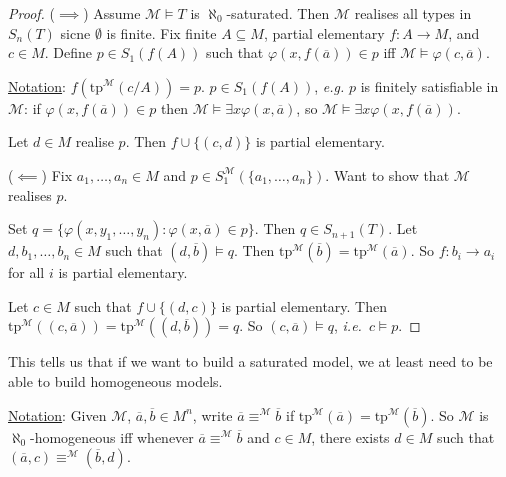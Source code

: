 \documentclass[]{article}
\theoremstyle{custhm}
\theoremstyle{cusdef}
\theoremstyle{custhm}
\theoremstyle{custhm}
\theoremstyle{custhm}
\theoremstyle{ex}
\theoremstyle{custhm}
\theoremstyle{cusdef}
\theoremstyle{remark}
\theoremstyle{remark}
\newcommand{\ra}{\rightarrow}
\newcommand{\ie}{\textit{i.e.}}
\renewcommand{\it}[1]{\textit{#1}}
\newcommand{\M}{\mathcal{M}}
\renewcommand{\phi}{\varphi}
\renewcommand{\bar}{\overline}
\newcommand{\tp}{\textrm{tp}}
\renewcommand{\subset}{\subseteq}
\begin{document}
\begin{proof}
($\implies$) Assume $\M\models T$ is $\aleph_0$-saturated. Then $\M$ realises all types in $S_n(T)$ sicne $\emptyset$ is finite. Fix finite $A\subset M$, partial elementary $f:A\ra M$, and $c\in M$. Define $p\in S_1(f(A))$ such that $\phi(x,f(\bar{a}))\in p$ iff $\M\models \phi(c,\bar{a})$.

\underline{Notation}: $f(\tp^\M(c/A)) = p$. $p \in S_1(f(A))$, \it{e.g.} $p$ is finitely satisfiable in $\M$: if $\phi(x,f(\bar{a}))\in p$ then $\M\models \exists x \phi(x,\bar{a})$, so $\M\models \exists x \phi(x,f(\bar{a}))$.

Let $d \in M$ realise $p$. Then $f\cup\{(c,d)\}$ is partial elementary.

($\impliedby$) Fix $a_1,\dots,a_n\in M$ and $p\in S_1^\M(\{a_1,\dots,a_n\})$. Want to show that $\M$ realises $p$.

Set $q = \{\phi(x,y_1,\dots,y_n):\phi(x,\bar{a})\in p\}$. Then $q \in S_{n+1}(T)$. Let $d,b_1,\dots,b_n \in M$ such that $(d,\bar{b})\models q$. Then $\tp^\M(\bar{b}) = \tp^\M(\bar{a})$. So $f:b_i\ra a_i$ for all $i$ is partial elementary.

Let $c\in M$ such that $f\cup \{(d,c)\}$ is partial elementary. Then $\tp^\M((c,\bar{a})) = \tp^\M((d,\bar{b})) = q$. So $(c,\bar{a})\models q$, \ie\ $c\models p$.
\end{proof}

This tells us that if we want to build a saturated model, we at least need to be able to build homogeneous models.

\underline{Notation}: Given $\M$, $\bar{a},\bar{b}\in M^n$, write $\bar{a}\equiv^\M\bar{b}$ if $\tp^\M(\bar{a}) = \tp^\M(\bar{b})$. So $\M$ is $\aleph_0$-homogeneous iff whenever $\bar{a}\equiv^\M\bar{b}$ and $c\in M$, there exists $d\in M$ such that $(\bar{a},c) \equiv^\M (\bar{b},d)$.
\end{document}
